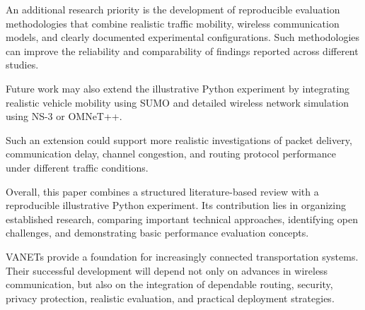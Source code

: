 An additional research priority is
the development of reproducible
evaluation methodologies that combine
realistic traffic mobility,
wireless communication models,
and clearly documented experimental
configurations. Such methodologies
can improve the reliability and
comparability of findings reported
across different studies.

Future work may also extend the
illustrative Python experiment by
integrating realistic vehicle
mobility using SUMO and detailed
wireless network simulation using
NS-3 or OMNeT++.

Such an extension could support
more realistic investigations of
packet delivery, communication
delay, channel congestion, and
routing protocol performance
under different traffic conditions.

Overall, this paper combines a
structured literature-based review
with a reproducible illustrative
Python experiment. Its contribution
lies in organizing established
research, comparing important
technical approaches, identifying
open challenges, and demonstrating
basic performance evaluation concepts.

VANETs provide a foundation
for increasingly connected
transportation systems. Their
successful development will depend
not only on advances in wireless
communication, but also on the
integration of dependable routing,
security, privacy protection,
realistic evaluation, and
practical deployment strategies.
